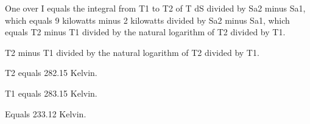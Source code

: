 One over I equals the integral from T1 to T2 of T dS divided by Sa2 minus Sa1, which equals 9 kilowatts minus 2 kilowatts divided by Sa2 minus Sa1, which equals T2 minus T1 divided by the natural logarithm of T2 divided by T1.

T2 minus T1 divided by the natural logarithm of T2 divided by T1.

T2 equals 282.15 Kelvin.

T1 equals 283.15 Kelvin.

Equals 233.12 Kelvin.